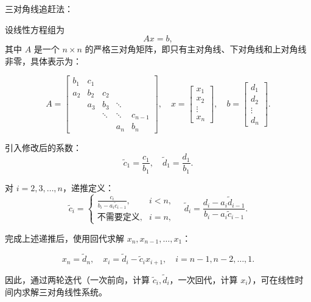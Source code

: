 三对角线追赶法：

设线性方程组为
\[
Ax = b,
\]
其中 \(A\) 是一个 \(n \times n\) 的严格三对角矩阵，即只有主对角线、下对角线和上对角线非零，具体表示为：

\[
A = 
\begin{bmatrix}
b_1 & c_1 &        &        &  \\
a_2 & b_2 & c_2    &        &  \\
    & a_3 & b_3    & \ddots &  \\
    &     & \ddots & \ddots & c_{n-1} \\
    &     &        & a_n    & b_n
\end{bmatrix}, \quad
x = 
\begin{bmatrix}
x_1 \\
x_2 \\
\vdots \\
x_n
\end{bmatrix}, \quad
b = 
\begin{bmatrix}
d_1 \\
d_2 \\
\vdots \\
d_n
\end{bmatrix}.
\]

引入修改后的系数：
\[
\tilde{c}_1 = \frac{c_1}{b_1}, \quad
\tilde{d}_1 = \frac{d_1}{b_1}.
\]

对 \(i = 2,3,\ldots,n\)，递推定义：
\[
\tilde{c}_i = 
\begin{cases}
\frac{c_i}{b_i - a_i \tilde{c}_{i-1}}, & i < n, \\
\text{不需要定义}, & i = n,
\end{cases}
\quad
\tilde{d}_i = \frac{d_i - a_i \tilde{d}_{i-1}}{b_i - a_i \tilde{c}_{i-1}}.
\]

完成上述递推后，使用回代求解 \(x_n, x_{n-1}, \ldots, x_1\)：

\[
x_n = \tilde{d}_n,
\quad
x_i = \tilde{d}_i - \tilde{c}_i x_{i+1}, \quad i = n-1, n-2, \ldots, 1.
\]

因此，通过两轮迭代（一次前向，计算 \(\tilde{c}_i, \tilde{d}_i\)，一次回代，计算 \(x_i\)），可在线性时间内求解三对角线性系统。


